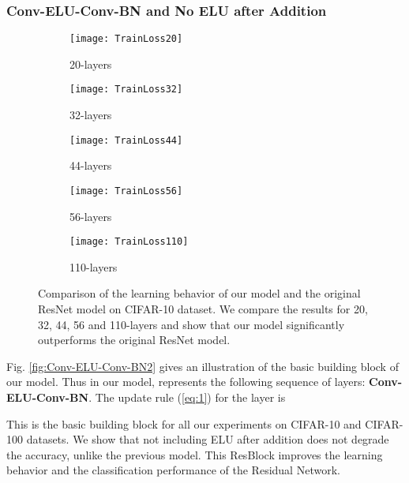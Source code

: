 \documentclass[10pt,twocolumn,letterpaper]{article}
\begin{document}
\subsubsection{Conv-ELU-Conv-BN and No ELU after Addition}

\begin{figure*}
    \centering
    \begin{subfigure}{.33\linewidth}
        \centering
        \texttt{[image: TrainLoss20]}
        \caption{20-layers}
        \label{fig:Cifar10TrainLoss20}
    \end{subfigure}
    \begin{subfigure}{.33\linewidth}
        \centering
        \texttt{[image: TrainLoss32]}
        \caption{32-layers}
        \label{fig:Cifar10TrainLoss32}
    \end{subfigure}
    \begin{subfigure}{.33\linewidth}
        \centering
        \texttt{[image: TrainLoss44]}
        \caption{44-layers}
        \label{fig:Cifar10TrainLoss44}
    \end{subfigure}
    \begin{subfigure}{.4\linewidth}
        \centering
        \texttt{[image: TrainLoss56]}
        \caption{56-layers}
        \label{fig:Cifar10TrainLoss56}
    \end{subfigure}
    \begin{subfigure}{.4\linewidth}
        \centering
        \texttt{[image: TrainLoss110]}
        \caption{110-layers}
        \label{fig:Cifar10TrainLoss110}
    \end{subfigure}
    \caption{Comparison of the learning behavior of our model and the original ResNet model on CIFAR-10 dataset. We compare the results for 20, 32, 44, 56 and 110-layers and show that our model significantly outperforms the original ResNet model.}
    \label{fig:Cifar10TrainLoss}
\end{figure*}

Fig. \ref{fig:Conv-ELU-Conv-BN2} gives an illustration of the basic building block of our model. Thus in our model,  represents the following sequence of layers: \textbf{Conv-ELU-Conv-BN}. The update rule (\ref{eq:1}) for the  layer is 



This is the basic building block for all our experiments on CIFAR-10 and CIFAR-100 datasets. We show that not including ELU after addition does not degrade the accuracy, unlike the previous model. This ResBlock improves the learning behavior and the classification performance of the Residual Network. 
\end{document}
